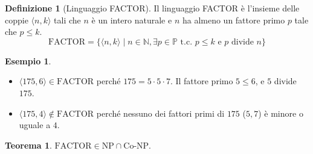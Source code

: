 \documentclass[a4paper]{article}
\theoremstyle{definition} %
\newtheorem{theorem}{Teorema}
\newtheorem{definition}{Definizione}
\newtheorem{example}{Esempio}
\begin{document}
\begin{definition}[Linguaggio FACTOR]
Il linguaggio FACTOR è l'insieme delle coppie $\langle n, k \rangle$ tali che $n$ è un intero naturale e $n$ ha almeno un fattore primo $p$ tale che $p \le k$.
\[
\text{FACTOR} = \{ \langle n, k \rangle \mid n \in \mathbb{N}, \exists p \in \mathbb{P} \text{ t.c. } p \le k \text{ e } p \text{ divide } n \}
\]
\end{definition}

\begin{example}
\begin{itemize}
    \item $\langle 175, 6 \rangle \in \text{FACTOR}$ perché $175 = 5 \cdot 5 \cdot 7$. Il fattore primo $5 \le 6$, e $5$ divide $175$.
    \item $\langle 175, 4 \rangle \notin \text{FACTOR}$ perché nessuno dei fattori primi di $175$ ($5, 7$) è minore o uguale a $4$.
\end{itemize}
\end{example}

\begin{theorem}
$\text{FACTOR} \in \text{NP} \cap \text{Co-NP}$.
\end{theorem}
\end{document}
